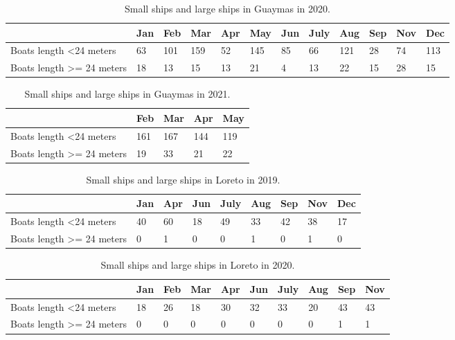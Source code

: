 \begin{table}[h!]
\begin{tabular}{|l|l|l|l|l|l|l|l|l|l|l|l|}
\hline
                                       & Jan & Feb & Mar & Apr & May & Jun & July & Aug & Sep & Nov & Dec \\ \hline
Boats length \textless 24 meters       & 63  & 101 & 159 & 52  & 145 & 85  & 66   & 121 & 28  & 74  & 113 \\ \hline
Boats length \textgreater{}= 24 meters & 18  & 13  & 15  & 13  & 21  & 4   & 13   & 22  & 15  & 28  & 15  \\ \hline
\end{tabular}
\caption{Small ships and large ships in Guaymas in 2020.}
\end{table}



\begin{table}[h!]
\begin{tabular}{|l|l|l|l|l|}
\hline
                                       & Feb & Mar & Apr & May \\ \hline
Boats length \textless 24 meters       & 161 & 167 & 144 & 119 \\ \hline
Boats length \textgreater{}= 24 meters & 19  & 33  & 21  & 22  \\ \hline
\end{tabular}
\caption{Small ships and large ships in Guaymas in 2021.}
\end{table}



\begin{table}[h!]
\begin{tabular}{|l|l|l|l|l|l|l|l|l|}
\hline
                                       & Jan & Apr & Jun & July & Aug & Sep & Nov & Dec \\ \hline
Boats length \textless 24 meters       & 40  & 60  & 18  & 49   & 33  & 42  & 38  & 17  \\ \hline
Boats length \textgreater{}= 24 meters & 0   & 1   & 0   & 0    & 1   & 0   & 1   & 0   \\ \hline
\end{tabular}
\caption{Small ships and large ships in Loreto in 2019.}
\end{table}


\begin{table}[h!]
\begin{tabular}{|l|l|l|l|l|l|l|l|l|l|}
\hline
                                       & Jan & Feb & Mar & Apr & Jun & July & Aug & Sep & Nov \\ \hline
Boats length \textless 24 meters       & 18  & 26  & 18  & 30  & 32  & 33   & 20  & 43  & 43  \\ \hline
Boats length \textgreater{}= 24 meters & 0   & 0   & 0   & 0   & 0   & 0    & 0   & 1   & 1   \\ \hline
\end{tabular}
\caption{Small ships and large ships in Loreto in 2020.}
\end{table}



